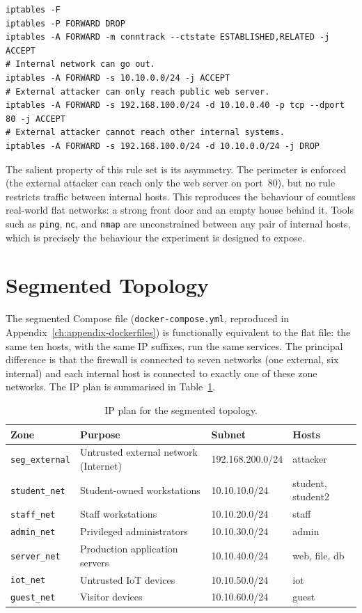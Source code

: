 \begin{lstlisting}[style=shellstyle, caption={Flat firewall ruleset (\texttt{firewall.sh})}, label=lst:fwflat]
iptables -F
iptables -P FORWARD DROP
iptables -A FORWARD -m conntrack --ctstate ESTABLISHED,RELATED -j ACCEPT
# Internal network can go out.
iptables -A FORWARD -s 10.10.0.0/24 -j ACCEPT
# External attacker can only reach public web server.
iptables -A FORWARD -s 192.168.100.0/24 -d 10.10.0.40 -p tcp --dport 80 -j ACCEPT
# External attacker cannot reach other internal systems.
iptables -A FORWARD -s 192.168.100.0/24 -d 10.10.0.0/24 -j DROP
\end{lstlisting}

The salient property of this rule set is its asymmetry. The perimeter is enforced (the external attacker can reach only the web server on port~80), but no rule restricts traffic between internal hosts. This reproduces the behaviour of countless real-world flat networks: a strong front door and an empty house behind it. Tools such as \texttt{ping}, \texttt{nc}, and \texttt{nmap} are unconstrained between any pair of internal hosts, which is precisely the behaviour the experiment is designed to expose.

\section{Segmented Topology}

The segmented Compose file (\texttt{docker-compose.yml}, reproduced in Appendix~\ref{ch:appendix-dockerfiles}) is functionally equivalent to the flat file: the same ten hosts, with the same IP suffixes, run the same services. The principal difference is that the firewall is connected to seven networks (one external, six internal) and each internal host is connected to exactly one of these zone networks. The IP plan is summarised in Table~\ref{tab:ip-plan}.

\begin{table}[H]
\centering
\caption{IP plan for the segmented topology.}
\label{tab:ip-plan}
\begin{tabularx}{\textwidth}{l X l l}
\toprule
\textbf{Zone} & \textbf{Purpose} & \textbf{Subnet} & \textbf{Hosts} \\
\midrule
\texttt{seg\_external} & Untrusted external network (Internet) & 192.168.200.0/24 & attacker \\
\texttt{student\_net} & Student-owned workstations & 10.10.10.0/24 & student, student2 \\
\texttt{staff\_net} & Staff workstations & 10.10.20.0/24 & staff \\
\texttt{admin\_net} & Privileged administrators & 10.10.30.0/24 & admin \\
\texttt{server\_net} & Production application servers & 10.10.40.0/24 & web, file, db \\
\texttt{iot\_net} & Untrusted IoT devices & 10.10.50.0/24 & iot \\
\texttt{guest\_net} & Visitor devices & 10.10.60.0/24 & guest \\
\bottomrule
\end{tabularx}
\end{table}

